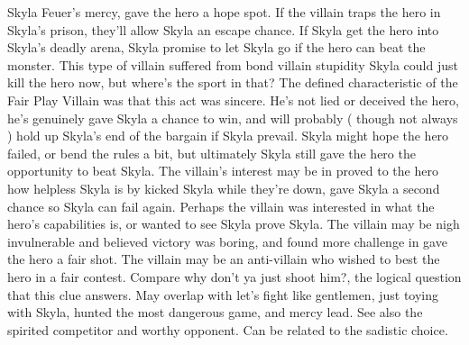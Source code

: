 \documentclass[12pt]{book}
\begin{document}
Skyla Feuer's mercy, gave the hero a hope spot. If the villain traps the hero in Skyla's prison, they'll allow Skyla an escape chance. If Skyla get the hero into Skyla's deadly arena, Skyla promise to let Skyla go if the hero can beat the monster. This type of villain suffered from bond villain stupidity  Skyla could just kill the hero now, but where's the sport in that? The defined characteristic of the Fair Play Villain was that this act was sincere. He's not lied or deceived the hero, he's genuinely gave Skyla a chance to win, and will probably ( though not always ) hold up Skyla's end of the bargain if Skyla prevail. Skyla might hope the hero failed, or bend the rules a bit, but ultimately Skyla still gave the hero the opportunity to beat Skyla. The villain's interest may be in proved to the hero how helpless Skyla is by kicked Skyla while they're down, gave Skyla a second chance so Skyla can fail again. Perhaps the villain was interested in what the hero's capabilities is, or wanted to see Skyla prove Skyla. The villain may be nigh invulnerable and believed victory was boring, and found more challenge in gave the hero a fair shot. The villain may be an anti-villain who wished to best the hero in a fair contest. Compare why don't ya just shoot him?, the logical question that this clue answers. May overlap with let's fight like gentlemen, just toying with Skyla, hunted the most dangerous game, and mercy lead. See also the spirited competitor and worthy opponent. Can be related to the sadistic choice.
\end{document}
